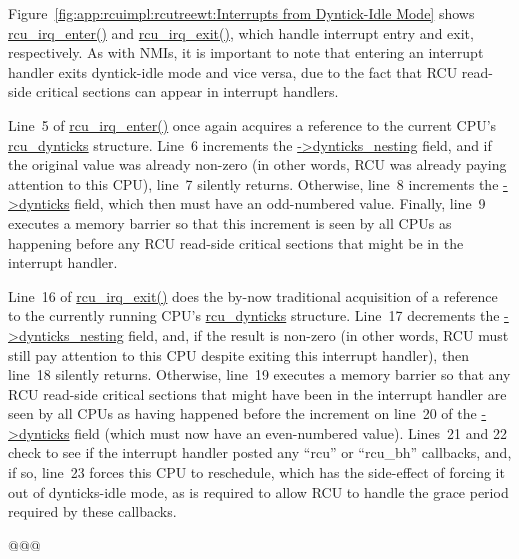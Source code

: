 Figure~\ref{fig:app:rcuimpl:rcutreewt:Interrupts from Dyntick-Idle Mode}
shows \url{rcu_irq_enter()} and \url{rcu_irq_exit()}, which handle
interrupt entry and exit, respectively.
As with NMIs, it is important to note that entering an interrupt
handler exits dyntick-idle mode and vice versa, due to the fact
that RCU read-side critical sections can appear in interrupt handlers.

Line~5 of \url{rcu_irq_enter()} once again acquires a reference to
the current CPU's \url{rcu_dynticks} structure.
Line~6 increments the \url{->dynticks_nesting} field, and if the
original value was already non-zero (in other words, RCU was
already paying attention to this CPU), line~7 silently returns.
Otherwise, line~8 increments the  \url{->dynticks} field, which
then must have an odd-numbered value.
Finally, line~9 executes a memory barrier so that this increment
is seen by all CPUs as happening before any RCU read-side critical
sections that might be in the interrupt handler.

Line~16 of \url{rcu_irq_exit()} does the by-now traditional acquisition
of a reference to the currently running CPU's \url{rcu_dynticks} structure.
Line~17 decrements the \url{->dynticks_nesting} field, and, if the
result is non-zero (in other words, RCU must still pay attention
to this CPU despite exiting this interrupt handler), then line~18
silently returns.
Otherwise, line~19 executes a memory barrier so that any RCU read-side
critical sections that might have been in the interrupt handler are
seen by all CPUs as having happened before the increment on line~20
of the \url{->dynticks} field (which must now have an even-numbered
value).
Lines~21 and 22 check to see if the interrupt handler posted any
``rcu'' or ``rcu\_bh'' callbacks, and, if so, line~23 forces this
CPU to reschedule, which has the side-effect of forcing it out of
dynticks-idle mode, as is required to allow RCU to handle the
grace period required by these callbacks.

@@@


